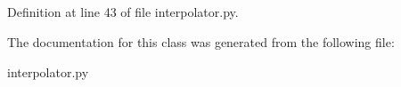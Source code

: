\subsection*{}

\subsection*{}

\subsection*{}

\subsection*{}

\subsection*{}

\subparagraph*{}

Definition at line 43 of file interpolator.\+py.



The documentation for this class was generated from the following file\+:\begin{DoxyCompactItemize}
\item 
interpolator.\+py\end{DoxyCompactItemize}
